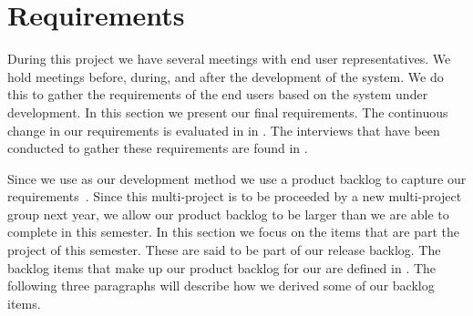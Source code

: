 \section{Requirements}
\label{sec:requirements}
During this project we have several meetings with end user representatives.
We hold meetings before, during, and after the development of the system. 
We do this to gather the requirements of the end users based on the system under development.
In this section we present our final requirements.
The continuous change in our requirements is evaluated in  in .
The interviews that have been conducted to gather these requirements are found in .

Since we use \scrum{} as our development method we use a product backlog to capture our requirements~\cite[p.~114]{Larman04}.
Since this multi-project is to be proceeded by a new multi-project group next year, we allow our product backlog to be larger than we are able to complete in this semester.
In this section we focus on the items that are part the project of this semester.
These are said to be part of our release backlog.
The backlog items that make up our product backlog for our \subsystem{} are defined in .
The following three paragraphs will describe how we derived some of our backlog items.

